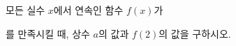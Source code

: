 모든 실수 $x$에서 연속인 함수 $f(x)$가 \par\smallskip{}\par\smallskip\noindent 를 만족시킬 때, 상수 $a$의 값과 $f(2)$의 값을 구하시오.
